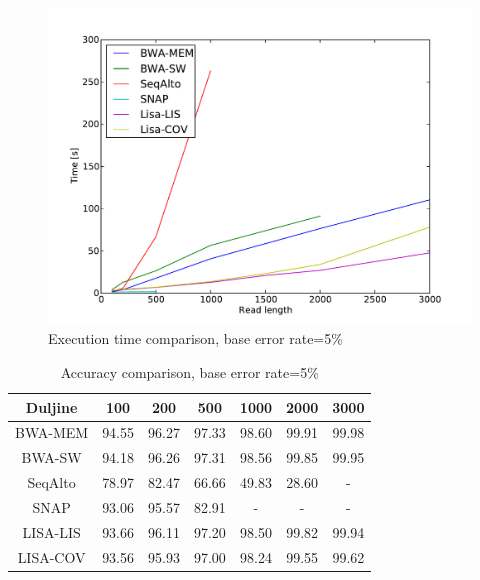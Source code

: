 \documentclass[times, utf8, diplomski]{fer}
\begin{document}
\begin{figure}[H]
\centering
\includegraphics[width=1.0\textwidth]{../img/yersinia-e05-time.pdf}
\caption{Execution time comparison, base error rate=5\%}\label{yersinia-e05-time}
\end{figure}

\begin{table}[H]
\centering
\begin{tabular}{|c||c|c|c|c|c|c|}
\hline
	Duljine & 100 & 200 & 500 & 1000 & 2000 & 3000\\
\hline
\hline
	BWA-MEM & 94.55 & 96.27 & 97.33 & 98.60 & 99.91 & 99.98\\
\hline
	BWA-SW  & 94.18 & 96.26 & 97.31 & 98.56 & 99.85 & 99.95\\
\hline
	SeqAlto & 78.97 & 82.47 & 66.66 & 49.83 & 28.60 & -\\
\hline
	SNAP    & 93.06 & 95.57 & 82.91 & - & - & -\\
\hline
	LISA-LIS  & 93.66 & 96.11 & 97.20 & 98.50 & 99.82 & 99.94\\
\hline
	LISA-COV & 93.56 & 95.93 & 97.00 & 98.24 & 99.55 & 99.62\\
\hline
\end{tabular}
\caption{Accuracy comparison, base error rate=5\%}\label{yersinia-e05-correct}
\end{table}
\end{document}
